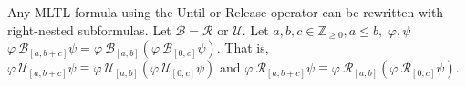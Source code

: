 \documentclass[runningheads]{llncs}
\renewcommand{\phi}{\varphi}
\begin{document}
 \begin{theorem} \label{NestedUR}
   Any MLTL formula using the Until or Release operator can be rewritten with right-nested subformulas. Let $\mathcal{B} = \mathcal{R} \text{ or } \mathcal{U}$. Let $a,b,c \in \mathbb{Z}_{\geq 0} , a \leq b,$  $ \phi,   \psi$  $ \phi \ \mathcal{B}_{[a,b+c]} \psi = \phi \ \mathcal{B}_{[a,b]}(\phi \ \mathcal{B}_{[0,c]} \psi)$. That is, $ \phi \ \mathcal{U}_{[a,b+c]} \psi \equiv \phi \ \mathcal{U}_{[a,b]}(\phi \ \mathcal{U}_{[0,c]} \psi)$ and $ \phi \ \mathcal{R}_{[a,b+c]} \psi \equiv \phi \ \mathcal{R}_{[a,b]}(\phi \ \mathcal{R}_{[0,c]} \psi)$.
\end{theorem}





\end{document}
